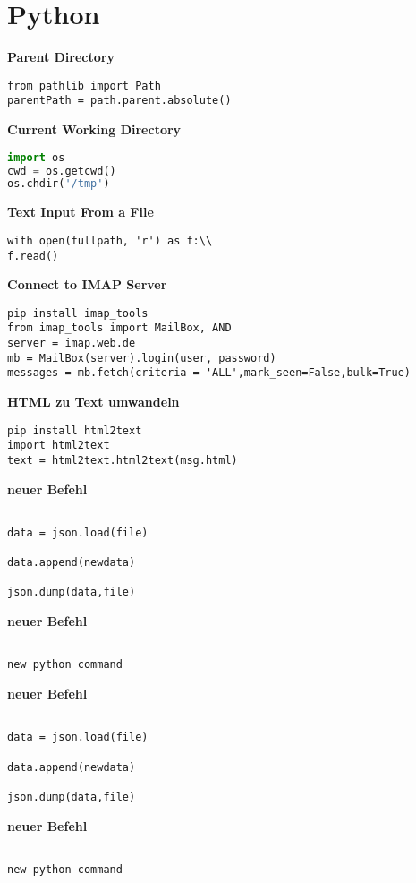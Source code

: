 \chapter{Python}\label{chap:Python}
\textbf{Parent Directory}
\begin{lstlisting}
from pathlib import Path
parentPath = path.parent.absolute()
\end{lstlisting}
\textbf{Current Working Directory}
\begin{lstlisting}[language=Python]
import os
cwd = os.getcwd()
os.chdir('/tmp')
\end{lstlisting}
\textbf{Text Input From a File}
\begin{lstlisting}
with open(fullpath, 'r') as f:\\
f.read()
\end{lstlisting}
\textbf{Connect to IMAP Server}
\begin{lstlisting}
pip install imap_tools
from imap_tools import MailBox, AND
server = imap.web.de
mb = MailBox(server).login(user, password)
messages = mb.fetch(criteria = 'ALL',mark_seen=False,bulk=True)
\end{lstlisting}
\textbf{HTML zu Text umwandeln}
\begin{lstlisting}
pip install html2text
import html2text
text = html2text.html2text(msg.html)
\end{lstlisting}
\textbf{neuer Befehl}\begin{lstlisting}

data = json.load(file)

data.append(newdata)

json.dump(data,file)

\end{lstlisting}
\textbf{neuer Befehl}\begin{lstlisting}

new python command
\end{lstlisting}
\textbf{neuer Befehl}\begin{lstlisting}

data = json.load(file)

data.append(newdata)

json.dump(data,file)

\end{lstlisting}
\textbf{neuer Befehl}\begin{lstlisting}

new python command
\end{lstlisting}
